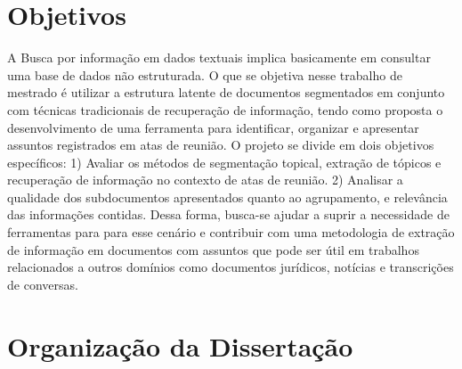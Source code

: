 







\section{Objetivos}

A Busca por informação em dados textuais implica basicamente em consultar uma base de dados não estruturada. O que se objetiva nesse trabalho de mestrado é utilizar a estrutura latente de documentos segmentados em conjunto com técnicas tradicionais de recuperação de informação, tendo como 
proposta o desenvolvimento de uma ferramenta para identificar, organizar e apresentar assuntos registrados em atas de reunião. O projeto se divide em dois objetivos específicos: 1) Avaliar os métodos de segmentação topical, extração de tópicos e recuperação de informação no contexto de atas de reunião. 2) Analisar a qualidade dos subdocumentos apresentados quanto ao agrupamento, e relevância das informações contidas.
Dessa forma, busca-se ajudar a suprir a necessidade de ferramentas para para esse cenário e contribuir com uma metodologia de extração de informação em documentos com assuntos que pode ser útil em trabalhos relacionados a outros domínios como documentos jurídicos, notícias e transcrições de conversas.











\section{Organização da Dissertação}





